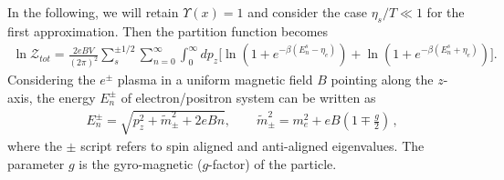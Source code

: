 

In the following, we will retain $\Upsilon(x)=1$ and consider the case $\eta_s/T\ll1$ for the first approximation. Then the partition function becomes
\begin{align}
\ln\mathcal{Z}_{tot}=\frac{2eBV}{(2\pi)^2}\sum_{s}^{\pm1/2}\sum_{n=0}^\infty\int^\infty_{0} \!\!dp_z\bigg[\ln\left(1+e^{-\beta(E_{n}^s-\eta_e)}\right)+\ln\left(1+e^{-\beta(E_{n}^s+\eta_e)}\right)\bigg].
\end{align}
Considering the $e^\pm$ plasma in a uniform magnetic field $B$ pointing along the $z$-axis, the energy $E_{n}^\pm$ of electron/positron system can be written as~\cite{Rafelski:2023emw}
\begin{align}
&E_{n}^\pm=\sqrt{p^2_z+\tilde m^2_\pm+2eBn},\qquad\tilde{m}^2_\pm=m^2_e+eB\left(1\mp\frac{g}{2}\right)\,,
\end{align}
where the $\pm$ script refers to spin aligned and anti-aligned eigenvalues. The parameter $g$ is the gyro-magnetic ($g$-factor) of the particle. 

